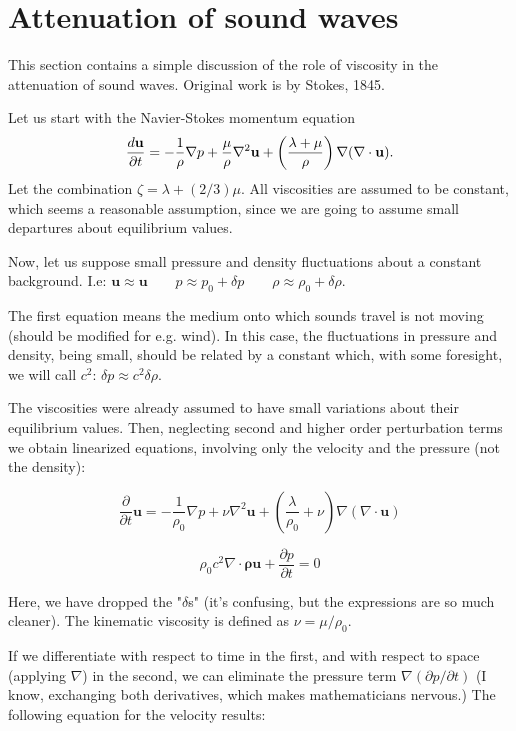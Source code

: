 \section{Attenuation of sound waves}

This section contains a simple discussion of the role of viscosity in
the attenuation of sound waves. Original work is by Stokes, 1845.

Let us start with the Navier-Stokes momentum equation
\[
\frac{d \mathbf{u} }{\partial t}=
- \frac{1}{\rho} \nabla p +
\frac{\mu}{\rho} \nabla^2 \mathbf{u} +
\left(\frac{\lambda+\mu}{\rho}\right) \nabla (\nabla\cdot\mathbf{u}).
\]
Let the combination $ \zeta = \lambda + (2/3) \mu$.
%
All viscosities are assumed to be constant, which seems a reasonable
 assumption, since we are going to assume small departures about
 equilibrium values.


Now, let us suppose small pressure and density fluctuations about a
constant background. I.e: $ \mathbf{u} \approx \mathbf{u} \qquad
p\approx p_0+\delta p \qquad \rho\approx \rho_0+\delta \rho .$

The first equation means the medium onto which sounds travel is not
moving (should be modified for e.g. wind). In this case, the
fluctuations in pressure and density, being small, should be related
by a constant which, with some foresight, we will call $ c^2$: $
\delta p \approx c^2 \delta \rho .$

The viscosities were already assumed to have small variations about
their equilibrium values. Then, neglecting second and higher order
perturbation terms we obtain linearized equations, involving only the
velocity and the pressure (not the density):

\[ \frac{\partial }{\partial t} \mathbf{u} = - \frac{1}{\rho_0} \nabla
p + \nu \nabla^2 \mathbf{u} + \left(\frac{\lambda}{\rho_0}+\nu\right)
\nabla (\nabla\cdot\mathbf{u}) \]

\[ \rho_0 c^2 \nabla \cdot \mathbf{\rho u} + \frac{\partial p}{\partial
  t} =0 \]

Here, we have dropped the "$ \delta$s" (it's confusing, but the
expressions are so much cleaner). The kinematic viscosity is defined
as $ \nu=\mu/\rho_0$.

If we differentiate with respect to time in the first, and with
respect to space (applying $ \nabla$) in the second, we can eliminate
the pressure term $ \nabla(\partial p/\partial t)$ (I know, exchanging
both derivatives, which makes mathematicians nervous.) The following
equation for the velocity results:

